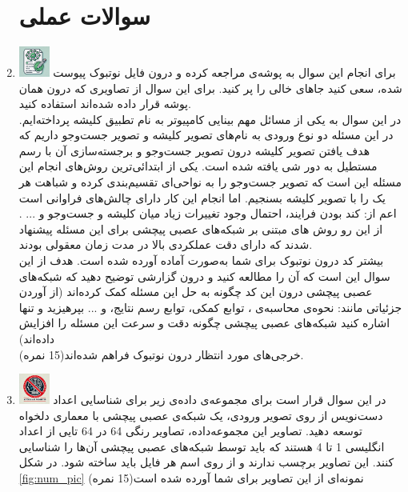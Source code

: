 \documentclass[12pt]{article}
\begin{document}
\begin{enumerate}
    \section*{سوالات عملی} 
    \item \includegraphics[width=1cm]{figs/Allowed_with_contributino.jpg}
    برای انجام این سوال به پوشه‌ی  مراجعه کرده و درون فایل نوتبوک پیوست شده، سعی کنید جاهای خالی را پر کنید. برای این سوال از تصاویری که درون همان پوشه قرار داده شده‌اند استفاده کنید.\\
    در این سوال به یکی از مسائل مهم بینایی کامپیوتر به نام تطبیق کلیشه پرداخته‌ایم. در این مسئله دو نوع ورودی به نام‌های تصویر کلیشه و تصویر جست‌وجو داریم که هدف یافتن تصویر کلیشه درون تصویر جست‌وجو و برجسته‌سازی آن با رسم مستطیل به دور شی یافته شده است. یکی از ابتدائی‌ترین روش‌های انجام این مسئله این است که تصویر جست‌وجو را به نواحی‌ای تقسیم‌بندی کرده و شباهت هر یک را با تصویر کلیشه بسنجیم. اما انجام این کار دارای چالش‌های فراوانی است اعم از: کند بودن فرایند، احتمال وجود تغییرات زیاد میان کلیشه و جست‌وجو و ... . از این رو روش های مبتنی بر شبکه‌های عصبی پیچشی برای این مسئله پیشنهاد شدند که دارای دقت عملکردی بالا در مدت زمان معقولی بودند.\\
    بیشتر کد درون نوتبوک برای شما به‌صورت آماده آورده شده است. هدف از این سوال این است که آن را مطالعه کنید و درون گزارشی توضیح دهید که شبکه‌های عصبی پیچشی درون این کد چگونه به حل این مسئله کمک کرده‌اند (از آوردن جزئیاتی مانند: نحوه‌ی محاسبه‌ی ، توابع کمکی، توابع رسم نتایج،  و ... بپرهیزید و تنها اشاره کنید شبکه‌های عصبی پیچشی چگونه دقت و سرعت این مسئله را افزایش داده‌اند)\\
    خرجی‌های مورد انتظار درون نوتبوک فراهم شده‌اند(15 نمره).

    \item \includegraphics[width=1cm]{figs/Forbidden_AI.jpg}
    در این سوال قرار است برای مجموعه‌ی داده‌ی زیر برای شناسایی اعداد دست‌نویس از روی تصویر ورودی، یک شبکه‌ی عصبی پیچشی با معماری دلخواه توسعه دهید. تصاویر این مجموعه‌داده، تصاویر رنگی 64 در 64 تایی از اعداد انگلیسی 1 تا 4 هستند که باید توسط شبکه‌های عصبی پیچشی آن‌ها را شناسایی کنند. این تصاویر برچسب ندارند و از روی اسم هر فایل باید ساخته شود. در شکل \ref{fig:num_pic} نمونه‌ای از این تصاویر برای شما آورده شده است(15 نمره)\\
    

\end{enumerate}
\end{document}
